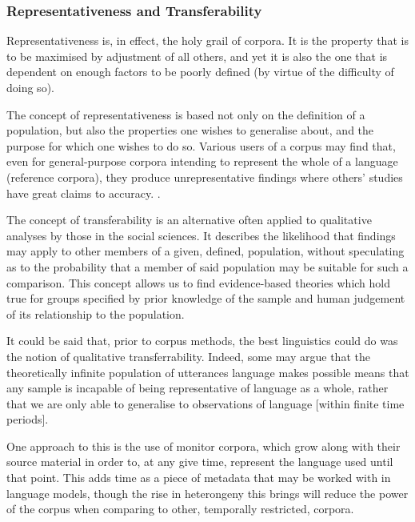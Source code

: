 



\subsubsection{Representativeness and Transferability}
Representativeness is, in effect, the holy grail of corpora.  It is the property that is to be maximised by adjustment of all others, and yet it is also the one that is dependent on enough factors to be poorly defined (by virtue of the difficulty of doing so).

The concept of representativeness is based not only on the definition of a population, but also the properties one wishes to generalise about, and the purpose for which one wishes to do so.  Various users of a corpus may find that, even for general-purpose corpora intending to represent the whole of a language (reference corpora), they produce unrepresentative findings where others' studies have great claims to accuracy. .

The concept of transferability %
is an alternative often applied to qualitative analyses by those in the social sciences.  It describes the likelihood that findings may apply to other members of a given, defined, population, without speculating as to the probability that a member of said population may be suitable for such a comparison.  This concept allows us to find evidence-based theories which hold true for groups specified by prior knowledge of the sample and human judgement of its relationship to the population.

It could be said that, prior to corpus methods, the best linguistics could do was the notion of qualitative transferrability.  Indeed, some may argue that the theoretically infinite population of utterances language makes possible means that any sample is incapable of being representative of language as a whole, rather that we are only able to generalise to observations of language [within finite time periods].

One approach to this is the use of monitor corpora, which grow along with their source material in order to, at any give time, represent the language used until that point.  This adds time as a piece of metadata that may be worked with in language models, though the rise in heterongeny this brings will reduce the power of the corpus when comparing to other, temporally restricted, corpora. 

